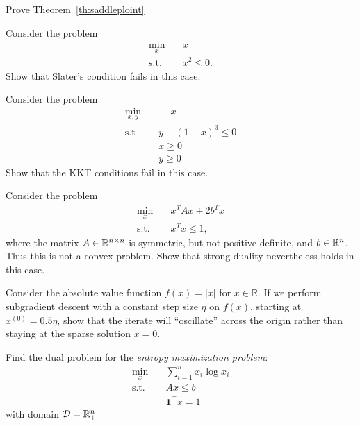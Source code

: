 \begin{myexercise}
Prove Theorem~\ref{th:saddleploint}
\end{myexercise}



\begin{myexercise}
Consider the problem
\begin{align*}
    \min_x &  \quad x \\
    \text{s.t.} & \quad x^2 \le 0.
\end{align*}
Show that Slater's condition fails in this case.
\end{myexercise}

\begin{myexercise}
    
Consider the problem
\begin{align*}
    \min_{x,y} &  \quad -x \\
    \text{s.t} & \quad y - (1-x)^3  \le 0 \\
               & \quad x \ge 0 \\
               & \quad y \ge 0
\end{align*}
Show that the KKT conditions fail in this case.
\end{myexercise}


\begin{myexercise}
 Consider the problem
\begin{align*}
\min_x & \quad x^T Ax + 2b^T x \\
\text{s.t.} & \quad x^T x \le 1,
\end{align*}
where the matrix $A \in \mathbb{R}^{n\times n}$ is symmetric, but not positive definite, and $b\in \mathbb{R}^n$. Thus this is not a convex problem. Show that strong duality nevertheless holds in this case.
\end{myexercise}


\begin{myexercise}
Consider the absolute value function $f(x) = |x|$ for  $x \in \mathbb{R}$.
If we perform subgradient descent with a constant step size $\eta$ on $f(x)$, starting at $x^{(0)} = 0.5\eta$, show that the iterate will ``oscillate'' across the origin rather than staying at the sparse solution $x=0$.
\end{myexercise}

\begin{myexercise}
Find the dual problem for the {\em entropy maximization problem}:
\begin{align*}
 \min_x & \quad  \sum_{i=1}^n x_i \log x_i \\
 \text{s.t.} & \quad Ax \le b \\
                   & \quad {\mathbf 1}^\top x = 1
\end{align*}
with domain ${\mathcal D} = \mathbb{R}^n_+$   
\end{myexercise}

